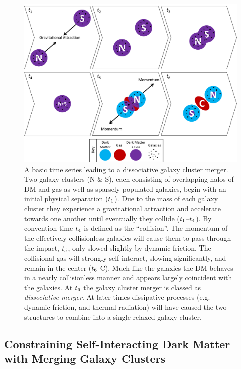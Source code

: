 \begin{figure}
\centering
\includegraphics[width=6in]{Chapter1/MergerTimeSeries.png}
\caption[A basic time series leading to a dissociative galaxy cluster merger.]{A basic time series leading to a dissociative galaxy cluster merger.
Two galaxy clusters (N \& S), each consisting of overlapping halos of DM and gas as well as sparsely populated galaxies, begin with an initial physical separation ($t_{\rm 1}$).
Due to the mass of each galaxy cluster they experience a gravitational attraction and accelerate towards one another until eventually they collide ($t_{\rm 1}$--$t_{\rm 4}$).
By convention time $t_{\rm 4}$ is defined as the ``collision''.
The momentum of the effectively collisionless galaxies will cause them to pass through the impact, $t_{\rm 5}$, only slowed slightly by dynamic friction. 
The collisional gas will strongly self-interact, slowing significantly, and remain in the center ($t_{\rm 6}$ C).
Much like the galaxies the DM behaves in a nearly collisionless manner and appears largely coincident with the galaxies.
At $t_{\rm 6}$ the galaxy cluster merger is classed as \emph{dissociative merger}.
At later times dissipative processes (e.g. dynamic friction, and thermal radiation) will have caused the two structures to combine into a single relaxed galaxy cluster.
\label{fig:MergerTimeSeries}}
\end{figure}  

\subsection{Constraining Self-Interacting Dark Matter with Merging Galaxy Clusters}\label{section:DMconstraintWithMergers}

